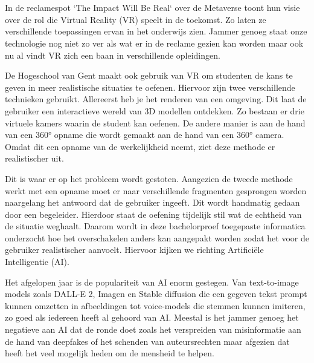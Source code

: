 
\chapter{}%
\label{ch:inleiding}

In de reclamespot `The Impact Will Be Real` over de Metaverse toont \textcite{Meta2022} hun visie over de rol die Virtual Reality (VR) speelt in de toekomst. Zo laten ze verschillende toepassingen ervan in het onderwijs zien. Jammer genoeg staat onze technologie nog niet zo ver als wat er in de reclame gezien kan worden maar ook nu al vindt VR zich een baan in verschillende opleidingen.

De Hogeschool van Gent maakt ook gebruik van VR om studenten de kans te geven in meer realistische situaties te oefenen. Hiervoor zijn twee verschillende technieken gebruikt. Allereerst heb je het renderen van een omgeving. Dit laat de gebruiker een interactieve wereld van 3D modellen ontdekken. Zo bestaan er drie virtuele kamers waarin de student kan oefenen. De andere manier is aan de hand van een 360° opname die wordt gemaakt aan de hand van een 360° camera. Omdat dit een opname van de werkelijkheid neemt, ziet deze methode er realistischer uit.

Dit is waar er op het probleem wordt gestoten. Aangezien de tweede methode werkt met een opname moet er naar verschillende fragmenten gesprongen worden naargelang het antwoord dat de gebruiker ingeeft. Dit wordt handmatig gedaan door een begeleider. Hierdoor staat de oefening tijdelijk stil wat de echtheid van de situatie weghaalt. Daarom wordt in deze bachelorproef toegepaste informatica onderzocht hoe het overschakelen anders kan aangepakt worden zodat het voor de gebruiker realistischer aanvoelt. Hiervoor kijken we richting Artificiële Intelligentie (AI).

Het afgelopen jaar is de populariteit van AI enorm gestegen. Van text-to-image models zoals DALL-E 2, Imagen en Stable diffusion die een gegeven tekst prompt kunnen omzetten in afbeeldingen tot voice-models die stemmen kunnen imiteren, zo goed als iedereen heeft al gehoord van AI. Meestal is het jammer genoeg het negatieve aan AI dat de ronde doet zoals het verspreiden van misinformatie aan de hand van deepfakes of het schenden van auteursrechten maar afgezien dat heeft het veel mogelijk heden om de mensheid te helpen.


